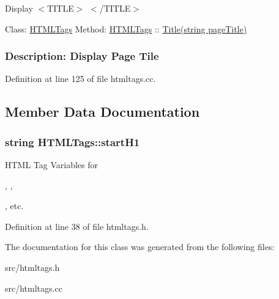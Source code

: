 Display $<$\-T\-I\-T\-L\-E$>$ $<$/\-T\-I\-T\-L\-E$>$ 



 Class\-: \hyperlink{classHTMLTags}{H\-T\-M\-L\-Tags} Method\-: \hyperlink{classHTMLTags}{H\-T\-M\-L\-Tags} \-:\-: \hyperlink{classHTMLTags_a5128d6f1c6be5ac1689047fc9d0d159f}{Title(string page\-Title)} \subsubsection*{Description\-: Display Page Tile}

Definition at line 125 of file htmltags.\-cc.



\subsection{Member Data Documentation}
\hypertarget{classHTMLTags_ae987289d0dab2e3e234048615f930d0f}{
\subsubsection[{start\-H1}]{\setlength{\rightskip}{0pt plus 5cm}string H\-T\-M\-L\-Tags\-::start\-H1\hspace{0.3cm}{\ttfamily [protected]}}}\label{classHTMLTags_ae987289d0dab2e3e234048615f930d0f}


H\-T\-M\-L Tag Variables for 

, , 

, etc. 



Definition at line 38 of file htmltags.\-h.



The documentation for this class was generated from the following files\-:\begin{DoxyCompactItemize}
\item 
src/htmltags.\-h\item 
src/htmltags.\-cc\end{DoxyCompactItemize}
